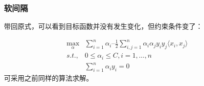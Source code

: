 \begin{frame}
\frametitle{软间隔}

带回原式，可以看到目标函数并没有发生变化，但约束条件变了：

\begin{align*}
\max_\alpha &\sum_{i=1}^n\alpha_i – \frac{1}{2}\sum_{i,j=1}^n\alpha_i\alpha_jy_iy_j\langle x_i,x_j\rangle \\
s.t., &0\leq \alpha_i\leq C, i=1,\ldots,n \\
&\sum_{i=1}^n\alpha_iy_i = 0
\end{align*}
可采用之前同样的算法求解。
\end{frame}
